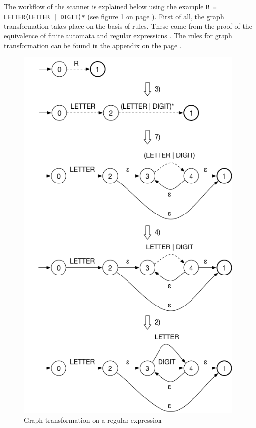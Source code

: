 The workflow of the scanner is explained below using the example \texttt{R = LETTER(LETTER | DIGIT)*} (see figure \ref{fig:graph_transformation} on page \pageref{fig:graph_transformation}). First of all, the graph transformation takes place on the basis of rules. These come from the proof of the equivalence of finite automata and regular expressions \cite{v2013}. The rules for graph transformation can be found in the appendix on the page \pageref{sec:rules_graph_transformation}.

\begin{figure}[bth]
	\centering
	\includegraphics[scale=0.5]{./img/graph_transformation}
	\caption[Graph transformation on a regular expression]{Graph transformation on a regular expression}
	\label{fig:graph_transformation}
\end{figure}
\noindent

